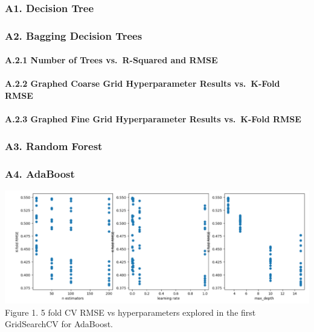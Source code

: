 \documentclass[
  letterpaper,
  DIV=11,
  numbers=noendperiod]{scrartcl}
\let\oldparagraph\paragraph
\renewcommand{\paragraph}[1]{\oldparagraph{#1}\mbox{}}
\begin{document}
\hypertarget{a1.-decision-tree}{%
\subsubsection{A1. Decision Tree}\label{a1.-decision-tree}}

\hypertarget{a2.-bagging-decision-trees}{%
\subsubsection{A2. Bagging Decision
Trees}\label{a2.-bagging-decision-trees}}

\hypertarget{a.2.1-number-of-trees-vs.-r-squared-and-rmse}{%
\paragraph{A.2.1 Number of Trees vs.~R-Squared and
RMSE}\label{a.2.1-number-of-trees-vs.-r-squared-and-rmse}}

\hypertarget{a.2.2-graphed-coarse-grid-hyperparameter-results-vs.-k-fold-rmse}{%
\paragraph{A.2.2 Graphed Coarse Grid Hyperparameter Results vs.~K-Fold
RMSE}\label{a.2.2-graphed-coarse-grid-hyperparameter-results-vs.-k-fold-rmse}}

\hypertarget{a.2.3-graphed-fine-grid-hyperparameter-results-vs.-k-fold-rmse}{%
\paragraph{A.2.3 Graphed Fine Grid Hyperparameter Results vs.~K-Fold
RMSE}\label{a.2.3-graphed-fine-grid-hyperparameter-results-vs.-k-fold-rmse}}

\hypertarget{a3.-random-forest}{%
\subsubsection{A3. Random Forest}\label{a3.-random-forest}}

\hypertarget{a4.-adaboost}{%
\subsubsection{A4. AdaBoost}\label{a4.-adaboost}}

\includegraphics{Project_Report_Saturn_files/figure-pdf/ada1.png} Figure
1. 5 fold CV RMSE vs hyperparameters explored in the first GridSearchCV
for AdaBoost.
\end{document}
